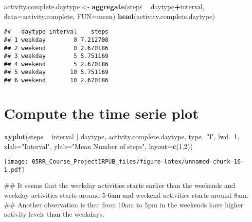 \documentclass[]{article}
\newenvironment{Shaded}{\begin{snugshade}}{\end{snugshade}}
\newcommand{\KeywordTok}[1]{\textcolor[rgb]{0.13,0.29,0.53}{\textbf{#1}}}
\newcommand{\DataTypeTok}[1]{\textcolor[rgb]{0.13,0.29,0.53}{#1}}
\newcommand{\DecValTok}[1]{\textcolor[rgb]{0.00,0.00,0.81}{#1}}
\newcommand{\StringTok}[1]{\textcolor[rgb]{0.31,0.60,0.02}{#1}}
\newcommand{\OperatorTok}[1]{\textcolor[rgb]{0.81,0.36,0.00}{\textbf{#1}}}
\newcommand{\NormalTok}[1]{#1}
\begin{document}
\begin{Shaded}
\begin{Highlighting}[]
\NormalTok{activity.complete.daytype <-}\StringTok{ }\KeywordTok{aggregate}\NormalTok{(steps }\OperatorTok{~}\StringTok{ }\NormalTok{daytype}\OperatorTok{+}\NormalTok{interval, }\DataTypeTok{data=}\NormalTok{activity.complete, }\DataTypeTok{FUN=}\NormalTok{mean)}
\KeywordTok{head}\NormalTok{(activity.complete.daytype)}
\end{Highlighting}
\end{Shaded}

\begin{verbatim}
##   daytype interval    steps
## 1 weekday        0 7.212708
## 2 weekend        0 2.670186
## 3 weekday        5 5.751169
## 4 weekend        5 2.670186
## 5 weekday       10 5.751169
## 6 weekend       10 2.670186
\end{verbatim}

\section{Compute the time serie plot}\label{compute-the-time-serie-plot}

\begin{Shaded}
\begin{Highlighting}[]
\KeywordTok{xyplot}\NormalTok{(steps }\OperatorTok{~}\StringTok{ }\NormalTok{interval }\OperatorTok{|}\StringTok{ }\NormalTok{daytype, activity.complete.daytype, }
       \DataTypeTok{type=}\StringTok{"l"}\NormalTok{, }
       \DataTypeTok{lwd=}\DecValTok{1}\NormalTok{, }
       \DataTypeTok{xlab=}\StringTok{"Interval"}\NormalTok{, }
       \DataTypeTok{ylab=}\StringTok{"Mean Number of steps"}\NormalTok{, }
       \DataTypeTok{layout=}\KeywordTok{c}\NormalTok{(}\DecValTok{1}\NormalTok{,}\DecValTok{2}\NormalTok{))}
\end{Highlighting}
\end{Shaded}

\texttt{[image: 05RR\_Course\_Project1RPUB\_files/figure-latex/unnamed-chunk-16-1.pdf]}

\begin{Shaded}
\begin{Highlighting}[]
\NormalTok{## It seems that the weekday activities starts earlier than the weekends and weekday activities starts around 5-6am and weekend activities starts around 8am. }
\NormalTok{## Another observation is that from 10am to 5pm in the weekends have higher activity levels than the weekdays.}
\end{Highlighting}
\end{Shaded}
\end{document}
